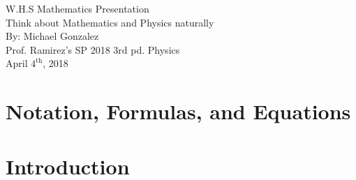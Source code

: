 \documentclass[12pt]{article}
\begin{document}
\sffamily
\begin{titlepage}
\begin{center}

\Huge{W.H.S Mathematics Presentation}\\
\LARGE{Think about Mathematics and Physics naturally}\\
[45mm]

\LARGE{By: Michael Gonzalez\\
[5mm]
Prof. Ramirez's SP 2018 3rd pd. Physics}\\
[5mm]

April $\text{4}^{\text{th}}$, 2018 \\
\end{center}
\end{titlepage}


\cleardoublepage

\section*{Notation, Formulas, and Equations}\label{sec:Formulas}



\cleardoublepage

\tableofcontents
\thispagestyle{empty}
\cleardoublepage

\setcounter{page}{1}
\section{Introduction}\label{sec:Intro}

\cleardoublepage
\end{document}
